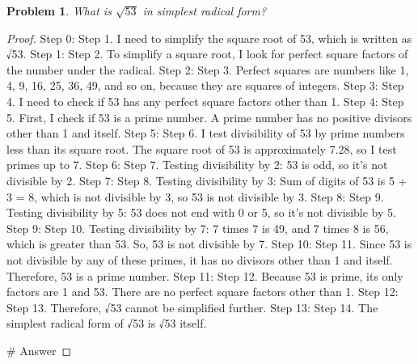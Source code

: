 \documentclass{article}
\newtheorem{theorem}{Problem}
\begin{document}
\begin{theorem}
What is $\sqrt{53}$ in simplest radical form?
\end{theorem}

\begin{proof}
Step 0: Step 1. I need to simplify the square root of 53, which is written as √53.
Step 1: Step 2. To simplify a square root, I look for perfect square factors of the number under the radical.
Step 2: Step 3. Perfect squares are numbers like 1, 4, 9, 16, 25, 36, 49, and so on, because they are squares of integers.
Step 3: Step 4. I need to check if 53 has any perfect square factors other than 1.
Step 4: Step 5. First, I check if 53 is a prime number. A prime number has no positive divisors other than 1 and itself.
Step 5: Step 6. I test divisibility of 53 by prime numbers less than its square root. The square root of 53 is approximately 7.28, so I test primes up to 7.
Step 6: Step 7. Testing divisibility by 2: 53 is odd, so it's not divisible by 2.
Step 7: Step 8. Testing divisibility by 3: Sum of digits of 53 is 5 + 3 = 8, which is not divisible by 3, so 53 is not divisible by 3.
Step 8: Step 9. Testing divisibility by 5: 53 does not end with 0 or 5, so it's not divisible by 5.
Step 9: Step 10. Testing divisibility by 7: 7 times 7 is 49, and 7 times 8 is 56, which is greater than 53. So, 53 is not divisible by 7.
Step 10: Step 11. Since 53 is not divisible by any of these primes, it has no divisors other than 1 and itself. Therefore, 53 is a prime number.
Step 11: Step 12. Because 53 is prime, its only factors are 1 and 53. There are no perfect square factors other than 1.
Step 12: Step 13. Therefore, √53 cannot be simplified further.
Step 13: Step 14. The simplest radical form of √53 is √53 itself.

        # Answer

\end{proof}
\end{document}
